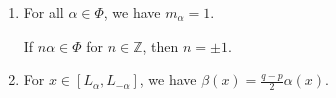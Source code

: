 \begin{enumerate}[label=(\alph*)]
	\item For all $\alpha \in \Phi$, we have $m_\alpha = 1$.

		If $n\alpha \in \Phi$ for $n \in \mathbb{Z}$, then $n = \pm 1$.
	\item For $x \in [L_\alpha, L_{-\alpha}]$, we have
		$\beta(x) = \frac{q - p}{2}\alpha(x)$.
\end{enumerate}
